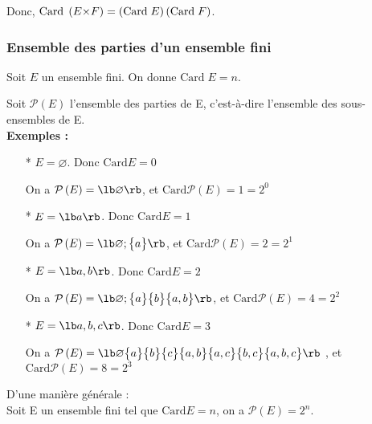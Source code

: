 Donc, $\mathrm{Card} \; \left(E {\Large\times} F\right) = \left(\mathrm{Card} \; E\right)\left(\mathrm{Card} \; F\right)$. \\

\subsubsection{Ensemble des parties d'un ensemble fini}

Soit $E$ un ensemble fini. On donne $\mathrm{Card} \; E = n$.

Soit $\mathcal{P} \left(E\right)$ l'ensemble des parties de E, c'est-à-dire l'ensemble des sous-ensembles de E. \\

\textbf{Exemples : } \\

\begin{itemize}
\item[*] $E = \varnothing$. Donc $\mathrm{Card} E = 0$

On a $\mathcal{P} \left(E\right) = \lb \varnothing \rb $, et $\mathrm{Card} \mathcal{P}\left(E\right)  = 1 = 2^0$ \\
\item[*] $E = \lb a \rb $. Donc $\mathrm{Card} E = 1$ 

On a $\mathcal{P} \left(E\right) = \lb \varnothing ; \big\lbrace a \big\rbrace \rb $,  et $\mathrm{Card} \mathcal{P}\left(E\right)  = 2 = 2^1$ \\
\item[*] $E = \lb a,b \rb $. Donc $\mathrm{Card} E = 2$

On a $\mathcal{P} \left(E\right) = \lb \varnothing ;\big\lbrace a \big\rbrace \big\lbrace b \big\rbrace \big\lbrace a,b \big\rbrace \rb $,  et $\mathrm{Card} \mathcal{P}\left(E\right)  = 4 = 2^2$ \\
\item[*] $E = \lb a,b,c \rb $. Donc $\mathrm{Card} E = 3$

On a $\mathcal{P} \left(E\right) = \lb \varnothing \big\lbrace a \big\rbrace \big\lbrace b \big\rbrace \big\lbrace c \big\rbrace \big\lbrace a,b \big\rbrace \big\lbrace a,c \big\rbrace \big\lbrace b,c \big\rbrace \big\lbrace a,b,c \big\rbrace \rb$ , et $\mathrm{Card} \mathcal{P}\left(E\right)  = 8 = 2^3$  \\
\end{itemize}

\vspace{.3cm}

D'une manière générale : \\ Soit E un ensemble fini tel que $\mathrm{Card} E = n$, on a $\mathcal{P} \left(E\right) = 2^n$. \\

